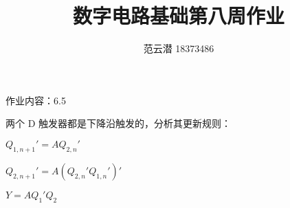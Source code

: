 \documentclass[lang=cn,11pt,a4paper,cite=authoryear]{elegantpaper}
\title{数字电路基础\quad 第八周作业}
\author{范云潜 18373486}
\institute{微电子学院 184111 班}
\date{\zhtoday}
\begin{document}
\maketitle

作业内容：6.5


两个 D 触发器都是下降沿触发的，分析其更新规则：

\(Q_{1,n+1}' = A Q_{2,n}'\) 

\(Q_{2,n+1}' = A (Q_{2,n}' Q_{1,n}')'\)

\(Y = A Q_1' Q_2\)


\end{document}
